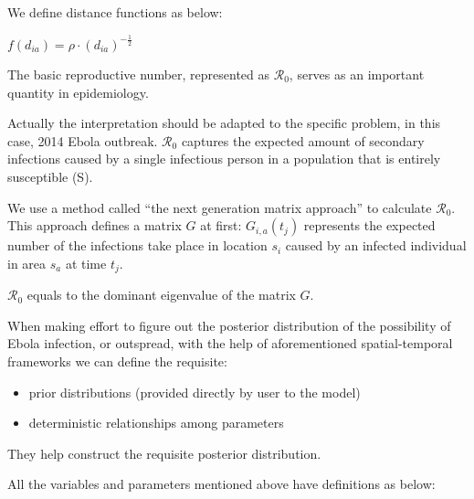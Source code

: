 \documentclass[12pt]{article}
\begin{document}
We define distance functions as below: 

\begin{center}
    $f(d_{ia}) = \rho \cdot (d_{ia})^{-\frac{1}{2}}$
\end{center}

The basic reproductive number, represented as $\mathcal{R}_0$, serves as an important quantity in epidemiology. 

Actually the interpretation should be adapted to the specific problem, in this case, 2014 Ebola outbreak. $\mathcal{R}_0$ captures the expected amount of secondary infections caused by a single infectious person in a population that is entirely susceptible (S). 

We use a method called ``the next generation matrix approach'' to calculate $\mathcal{R}_0$. This approach defines a matrix $G$ at first: $G_{i,a}(t_j)$ represents the expected number of the infections take place in location $s_i$ caused by an infected individual in area $s_a$ at time $t_j$.

$\mathcal{R}_0$ equals to the dominant eigenvalue of the matrix $G$.

When making effort to figure out the posterior distribution of the possibility of Ebola infection, or outspread, with the help of aforementioned spatial-temporal frameworks we can define the requisite:

\begin{itemize}
\item prior distributions (provided directly by user to the model)
\item deterministic relationships among parameters
\end{itemize}

They help construct the requisite posterior distribution. 

All the variables and parameters mentioned above have definitions as below:
\end{document}
